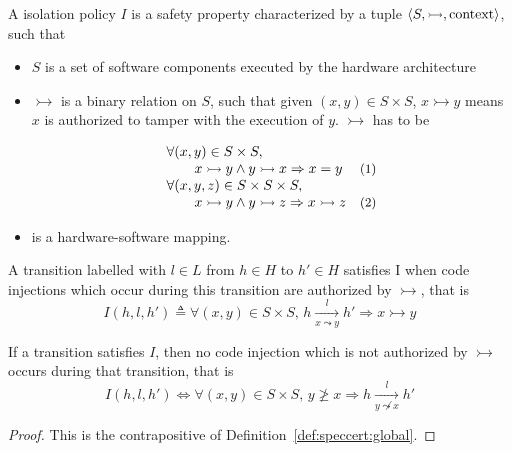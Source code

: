 \begin{definition}
  \label{def:speccert:global}
  A isolation policy $I$ is a safety property characterized by a tuple
  $\langle S, \rightarrowtail, \mathrm{context} \rangle$, such that
  \begin{itemize}
  \item $S$ is a set of software components executed by the hardware
    architecture
  \item $\rightarrowtail$ is a binary relation on $S$, such that given
    $(x, y) \in S \times S$, $x \rightarrowtail y$ means $x$ is authorized to
    tamper with the execution of $y$. $\rightarrowtail$ has to be
    \[
      \begin{array}{lr}
        \forall (x, y) \in S \times S,
        & \\
        \qquad x \rightarrowtail y \wedge y
        \rightarrowtail x \Rightarrow x = y
        & \text{\small (1)} \\
        \forall (x, y, z) \in S \times S \times S,
        & \\
        \qquad x \rightarrowtail y \wedge y
        \rightarrowtail z \Rightarrow x \rightarrowtail z
        & \text{\small (2)}
      \end{array}
    \]
  \item {} is a hardware-software mapping.
  \end{itemize}

  A transition labelled with $l \in L$ from $h \in H$ to $h' \in H$ satisfies I
  when code injections which occur during this transition are authorized by
  $\rightarrowtail$, that is
  \[
    I(h, l, h') \triangleq \forall (x, y) \in S \times S \text{, } h
    \xrightarrow[x \leadsto y]{l} h' \Rightarrow x \rightarrowtail y
  \]
\end{definition}

\begin{corollary}
  If a transition satisfies $I$, then no code injection which is not authorized
  by $\rightarrowtail$ occurs during that transition, that is
  \[
    I(h, l, h') \iff \forall (x, y) \in S \times S \text{, } y \not\ge x
    \Rightarrow h \xrightarrow[y \not\leadsto x]{l} h'
  \]
  

  \begin{proof}
    This is the contrapositive of Definition~\ref{def:speccert:global}.
  \end{proof}
\end{corollary}

